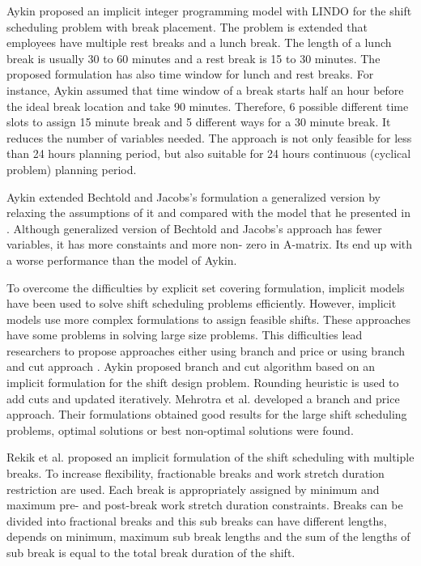 Aykin \cite{li:1996:aykin} proposed an implicit integer programming model with LINDO for the shift scheduling problem with break placement. The problem is extended that employees have multiple rest breaks and a lunch break. The length of a lunch break is usually 30 to 60 minutes and a rest break is 15 to 30 minutes. The proposed formulation has also time window for lunch and rest breaks. For instance, Aykin assumed that time window of a break starts half an hour before the ideal break location and take 90 minutes. Therefore, 6 possible different time slots to assign 15 minute break and 5 different ways for a 30 minute break. It reduces the number of variables needed. The approach is not only feasible for less than 24 hours planning period, but also suitable for 24 hours continuous (cyclical problem) planning period. 

Aykin \cite{li:2000:aykin} extended Bechtold and Jacobs's formulation \cite{li:1990:bechtold} a generalized version by relaxing the assumptions of it and compared with the model that he presented in  \cite{li:1996:aykin}. Although generalized version of Bechtold and Jacobs's approach has fewer variables, it has more constaints and more non- zero in A-matrix. Its end up with a worse performance than the model of Aykin.

To overcome the difficulties by explicit set covering formulation, implicit models have been used to solve shift scheduling problems efficiently. However, implicit models use more complex formulations to assign feasible shifts. These approaches have some problems in solving large size problems. This difficulties lead researchers to propose approaches either using branch and price \cite{li:2000:mehrotra}  or using branch and cut approach \cite{li:1998:aykin}. Aykin \cite{li:1998:aykin} proposed branch and cut algorithm based on an implicit formulation for the shift design problem. Rounding heuristic is used to add cuts and updated iteratively. Mehrotra et al. \cite{li:2000:mehrotra} developed a branch and price approach. Their formulations obtained good results for the large shift scheduling problems, optimal solutions or best non-optimal solutions were found.  

Rekik et al. \cite{li:2010:rekik} proposed an implicit formulation of the shift scheduling with multiple breaks. To increase flexibility, fractionable breaks and work stretch duration restriction are used. Each break is appropriately assigned by minimum and maximum pre- and post-break work stretch duration constraints. Breaks can  be divided into fractional breaks and this sub breaks can have different lengths, depends on minimum, maximum sub break lengths and the sum of the lengths of sub break is equal to the total break duration of the shift.


